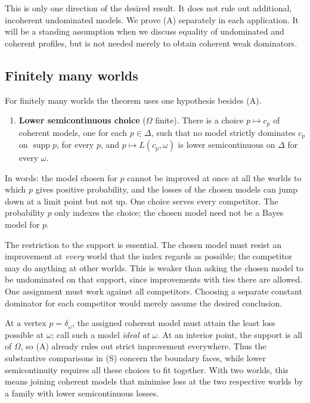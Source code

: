 \documentclass[11pt]{article}
\theoremstyle{definition}
\theoremstyle{remark}
\newcommand{\supp}{\operatorname{supp}}
\begin{document}
\newpage

This is only one direction of the desired result. It does not rule out additional, incoherent undominated models. We prove (A) separately in each application. It will be a standing assumption when we discuss equality of undominated and coherent profiles, but is not needed merely to obtain coherent weak dominators.

\subsection{Finitely many worlds}
\noindent For finitely many worlds the theorem uses one hypothesis besides (A).
\begin{enumerate}[label=\textbf{(S)},leftmargin=*]
\item \textbf{Lower semicontinuous choice} ($\Omega$ finite). There is a choice $p\mapsto c_p$ of coherent models, one for each $p\in\Delta$, such that no model strictly dominates $c_p$ on $\supp p$, for every $p$, and $p\mapsto L(c_p,\omega)$ is lower semicontinuous on $\Delta$ for every $\omega$.
\end{enumerate}
In words: the model chosen for $p$ cannot be improved at once at all the worlds to which $p$ gives positive probability, and the losses of the chosen models can jump down at a limit point but not up. One choice serves every competitor. The probability $p$ only indexes the choice; the chosen model need not be a Bayes model for $p$.


The restriction to the support is essential. The chosen model must resist an improvement at \emph{every} world that the index regards as possible; the competitor may do anything at other worlds. This is weaker than asking the chosen model to be undominated on that support, since improvements with ties there are allowed. One assignment must work against all competitors. Choosing a separate constant dominator for each competitor would merely assume the desired conclusion.

At a vertex $p=\delta_\omega$, the assigned coherent model must attain the least loss possible at $\omega$; call such a model \emph{ideal at $\omega$}. At an interior point, the support is all of $\Omega$, so (A) already rules out strict improvement everywhere. Thus the substantive comparisons in (S) concern the boundary faces, while lower semicontinuity requires all these choices to fit together. With two worlds, this means joining coherent models that minimise loss at the two respective worlds by a family with lower semicontinuous losses.
\end{document}
